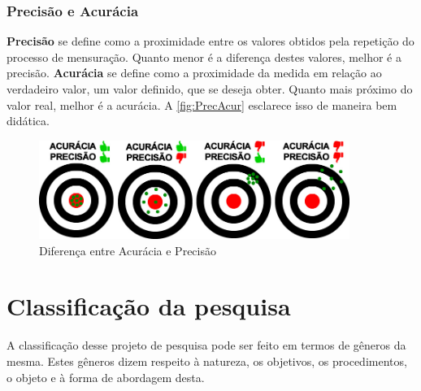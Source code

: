\documentclass[
	12pt,				%
	openright,			%
	oneside,
	a4paper,			%
	english,			%
	french,				%
	spanish,			%
	brazil,				%
	]{abntex2}
\begin{document}
\subsubsection{Precisão e Acurácia}

\textbf{Precisão} se define como a proximidade entre os valores obtidos pela repetição do processo de mensuração. Quanto menor é a diferença destes valores, melhor é a precisão. \textbf{Acurácia} se define como a proximidade da medida em relação ao verdadeiro valor, um valor definido, que se deseja obter. Quanto mais próximo do valor real, melhor é a acurácia. A \autoref{fig:PrecAcur} esclarece isso de maneira bem didática.

\begin{figure}
    \centering
    \includegraphics[width=0.9\textwidth]{Modelo_Projeto_Pesquisa_UFG_REJ_BCC/PrecisaoAcuracia.jpg}
    \caption{Diferença entre Acurácia e Precisão}
    \label{fig:PrecAcur}
\end{figure}


\section{Classificação da pesquisa}
\label{sec:classif}
A classificação desse projeto de pesquisa pode ser feito em termos de gêneros da mesma. Estes gêneros dizem respeito à natureza, os objetivos, os procedimentos, o objeto e à forma de abordagem desta.
\end{document}
